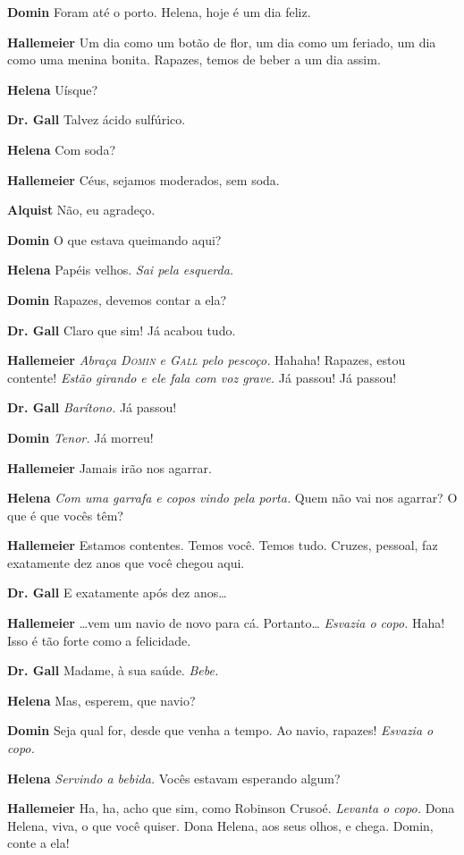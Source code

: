 \textbf{Domin} Foram até o porto. Helena, hoje é um dia feliz.

\textbf{Hallemeier} Um dia como um botão de flor, um dia como um feriado, um dia como
uma menina bonita. Rapazes, temos de beber a um dia assim.

\textbf{Helena} Uísque?

\textbf{Dr. Gall} Talvez ácido sulfúrico.

\textbf{Helena} Com soda?

\textbf{Hallemeier} Céus, sejamos moderados, sem soda.

\textbf{Alquist} Não, eu agradeço.

\textbf{Domin} O que estava queimando aqui?

\textbf{Helena} Papéis velhos. \emph{Sai pela esquerda.}

\textbf{Domin} Rapazes, devemos contar a ela?

\textbf{Dr. Gall} Claro que sim! Já acabou tudo.

\textbf{Hallemeier} \emph{Abraça \textsc{Domin} e \textsc{Gall} pelo pescoço.} Hahaha! Rapazes,
estou contente! \emph{Estão girando e ele fala com voz grave.} Já passou! Já
passou!

\textbf{Dr. Gall} \emph{Barítono.} Já passou!

\textbf{Domin} \emph{Tenor.} Já morreu!

\textbf{Hallemeier} Jamais irão nos agarrar.

\textbf{Helena} \emph{Com uma garrafa e copos vindo pela porta.} Quem não vai nos agarrar? 
O que é que vocês têm?

\textbf{Hallemeier} Estamos contentes. Temos você. Temos tudo. Cruzes, pessoal, faz
exatamente dez anos que você chegou aqui.

\textbf{Dr. Gall} E exatamente após dez anos\ldots{}

\textbf{Hallemeier} \ldots{}vem um navio de novo para cá. Portanto\ldots{} \emph{Esvazia o copo.}
Haha! Isso é tão forte como a felicidade.

\textbf{Dr. Gall} Madame, à sua saúde. \emph{Bebe.}

\textbf{Helena} Mas, esperem, que navio?

\textbf{Domin} Seja qual for, desde que venha a tempo. Ao navio, rapazes!
\emph{Esvazia o copo.}

\textbf{Helena} \emph{Servindo a bebida.} Vocês estavam esperando algum?

\textbf{Hallemeier} Ha, ha, acho que sim, como Robinson Crusoé. \emph{Levanta o copo.} Dona
Helena, viva, o que você quiser. Dona Helena, aos seus olhos, e chega. Domin, conte a ela!


